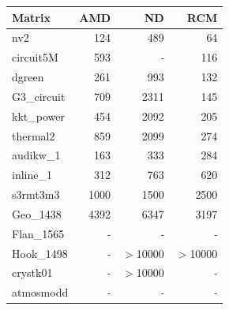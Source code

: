 \begin{table}[htbp]
  \centering
  \label{tab:breakeven_arm}
  \begin{tabular}{lrrr}
    \toprule
    \textbf{Matrix} & \textbf{AMD} & \textbf{ND} & \textbf{RCM}  \\
    \midrule
    nv2 & 124 & 489 & 64 \\
    circuit5M & 593 & \textit{ - } & 116 \\
    dgreen & 261 & 993 & 132 \\
    G3\_circuit & 709 & 2311 & 145 \\
    kkt\_power & 454 & 2092 & 205 \\
    thermal2 & 859 & 2099 & 274 \\
    audikw\_1 & 163 & 333 & 284 \\
    inline\_1 & 312 & 763 & 620 \\
    s3rmt3m3 & 1000 & 1500 & 2500 \\
    Geo\_1438 & 4392 & 6347 & 3197 \\
    Flan\_1565 & \textit{ - } & \textit{ - } & \textit{ - } \\
    Hook\_1498 & \textit{ - } & $>$10000 & $>$10000 \\
    crystk01 & \textit{ - } & $>$10000 & \textit{ - } \\
    atmosmodd & \textit{ - } & \textit{ - } & \textit{ - } \\
    \bottomrule
  \end{tabular}
\end{table}